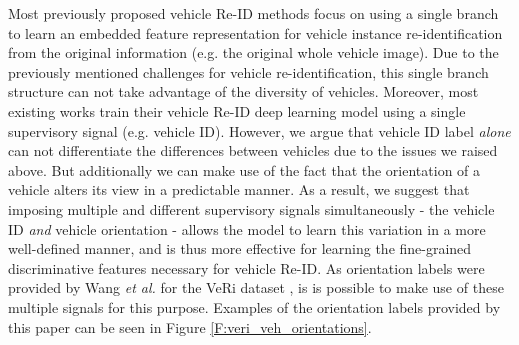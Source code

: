\documentclass[10pt,twocolumn,letterpaper]{article}
\def\etal{\emph{et al.\hspace{0.3em}}}
\begin{document}
Most previously proposed vehicle Re-ID methods \cite{liu2016vehicleid,liu2016veri,Shen_2017_ICCV,Zhou2018VAMI} focus on using a single branch
to learn an embedded feature representation for vehicle instance re-identification
from the original information (e.g. the original whole vehicle image).
%
Due to the previously mentioned challenges for vehicle re-identification,
this single branch structure can not take advantage of the diversity of vehicles.
%
Moreover, most existing works
\cite{liu2016vehicleid,liu2016veri}
train their vehicle Re-ID deep learning model
using a single supervisory signal (e.g. vehicle ID).
%
However, we argue that vehicle ID label {\em alone} can not differentiate the differences between vehicles due to the issues we raised above. But additionally we can make use of the fact that the orientation of a vehicle alters its view in a predictable manner.
As a result, we suggest that imposing multiple and different supervisory signals
simultaneously - the vehicle ID \emph{and} vehicle orientation - allows the model to learn this variation in a more well-defined manner, and is thus more effective
for learning the fine-grained discriminative features necessary for vehicle
Re-ID. As orientation labels were provided by Wang \etal \cite{Wang_2017_ICCV} for the VeRi dataset \cite{liu2016veri}, is is possible to make use of these multiple signals for this purpose. Examples of the orientation labels provided by this paper can be seen in Figure \ref{F:veri_veh_orientations}.
\end{document}
